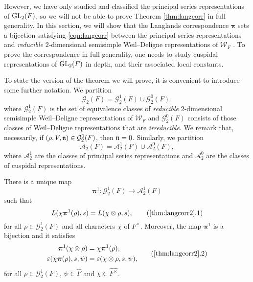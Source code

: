 However, we have only studied and classified the principal series representations of $\mathrm{GL}_2(F)$, so we will not be able to prove Theorem \ref{thm:langcorr} in full generality. In this section, we will show that the Langlands correspondence $\bm\pi$ sets a bijection satisfying \eqref{eqn:langcorr} between the principal series representations and \textit{reducible} $2$-dimensional semisimple Weil--Deligne representations of $\mathcal{W}_F$ . To prove the correspondence in full generality, one needs to study cuspidal representations of $\mathrm{GL}_2(F)$ in depth, and their associated local constants. 

To state the version of the theorem we will prove, it is convenient to introduce some further notation. We partition 
$$\mathcal{G}_2(F)=\mathcal{G}_2^1(F)\cup\mathcal{G}_2^0(F),$$
where $\mathcal{G}_2^1(F)$ is the set of equivalence classes of \textit{reducible} $2$-dimensional semisimple Weil--Deligne representations of $\mathcal{W}_F$ and $\mathcal{G}_2^0(F)$ consists of those classes of Weil--Deligne representations that are \textit{irreducible}. We remark that, necessarily, if $(\rho,V,\mathfrak{n})\in\mathcal{G}_2^0(F)$, then $\mathfrak{n}=0$. Similarly, we partition
$$\mathcal{A}_2(F)=\mathcal{A}_2^1(F)\cup\mathcal{A}_2^0(F),$$ 
where $\mathcal{A}_2^1$ are the classes of principal series representations and $\mathcal{A}_2^0$ are the classes of cuspidal representations.

\begin{thm}\label{thm:langcorr2}
    There is a unique map
    $$\bm\pi^1:\mathcal{G}_2^1(F)\longrightarrow\mathcal{A}_2^1(F)$$
    such that 
    \begin{equation}
        L(\chi\bm\pi^1(\rho),s)=L(\chi\otimes\rho,s),
        \label{eqn:langcorrLfunc}\tag{\ref{thm:langcorr2}.1}
    \end{equation}
    for all $\rho\in\mathcal{G}_2^1(F)$ and all characters $\chi$ of $F^\times$. Moreover, the map $\bm\pi^1$ is a bijection and it satisfies
    \begin{equation}
        \begin{split}
            \bm\pi^1(\chi\otimes\rho)&=\chi\bm\pi^1(\rho),\\
            \varepsilon(\chi\bm\pi(\rho),s,\psi)&=\varepsilon(\chi\otimes\rho,s,\psi),
        \end{split}
        \label{eqn:langcorreps}\tag{\ref{thm:langcorr2}.2}
    \end{equation}
    for all $\rho\in\mathcal{G}_2^1(F)$, $\psi\in\hat{F}$ and $\chi\in\hat{F^\times}$.
\end{thm}

